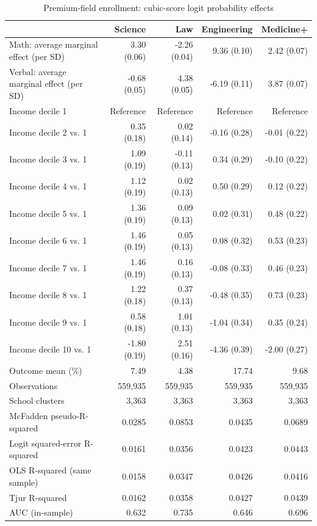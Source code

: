 \begin{table}[!htbp]\centering
\caption{Premium-field enrollment: cubic-score logit probability effects}
\label{tab:premium-field-logit-cubic}
\small
\begin{tabular}{lrrrr}\hline\hline
 & Science & Law & Engineering & Medicine+ \\ \hline
Math: average marginal effect (per SD) & 3.30 (0.06) & -2.26 (0.04) & 9.36 (0.10) & 2.42 (0.07) \\
Verbal: average marginal effect (per SD) & -0.68 (0.05) & 4.38 (0.05) & -6.19 (0.11) & 3.87 (0.07) \\
Income decile 1 & Reference & Reference & Reference & Reference \\
Income decile 2 vs. 1 & 0.35 (0.18) & 0.02 (0.14) & -0.16 (0.28) & -0.01 (0.22) \\
Income decile 3 vs. 1 & 1.09 (0.19) & -0.11 (0.13) & 0.34 (0.29) & -0.10 (0.22) \\
Income decile 4 vs. 1 & 1.12 (0.19) & 0.02 (0.13) & 0.50 (0.29) & 0.12 (0.22) \\
Income decile 5 vs. 1 & 1.36 (0.19) & 0.09 (0.13) & 0.02 (0.31) & 0.48 (0.22) \\
Income decile 6 vs. 1 & 1.46 (0.19) & 0.05 (0.13) & 0.08 (0.32) & 0.53 (0.23) \\
Income decile 7 vs. 1 & 1.46 (0.19) & 0.16 (0.13) & -0.08 (0.33) & 0.46 (0.23) \\
Income decile 8 vs. 1 & 1.22 (0.18) & 0.37 (0.13) & -0.48 (0.35) & 0.73 (0.23) \\
Income decile 9 vs. 1 & 0.58 (0.18) & 1.01 (0.13) & -1.04 (0.34) & 0.35 (0.24) \\
Income decile 10 vs. 1 & -1.80 (0.19) & 2.51 (0.16) & -4.36 (0.39) & -2.00 (0.27) \\
\hline
Outcome mean (\%) & 7.49 & 4.38 & 17.74 & 9.68 \\
Observations & 559,935 & 559,935 & 559,935 & 559,935 \\
School clusters & 3,363 & 3,363 & 3,363 & 3,363 \\
McFadden pseudo-R-squared & 0.0285 & 0.0853 & 0.0435 & 0.0689 \\
Logit squared-error R-squared & 0.0161 & 0.0356 & 0.0423 & 0.0443 \\
OLS R-squared (same sample) & 0.0158 & 0.0347 & 0.0426 & 0.0416 \\
Tjur R-squared & 0.0162 & 0.0358 & 0.0427 & 0.0439 \\
AUC (in-sample) & 0.632 & 0.735 & 0.646 & 0.696 \\

\end{tabular}
\end{table}
